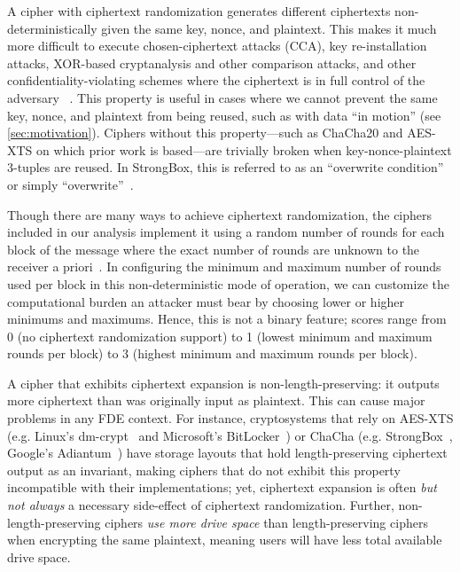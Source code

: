 
 A cipher with ciphertext
randomization generates different ciphertexts non-deterministically given the
same key, nonce, and plaintext. This makes it much more difficult to execute
chosen-ciphertext attacks (CCA), key re-installation attacks, XOR-based
cryptanalysis and other comparison attacks, and other confidentiality-violating
schemes where the ciphertext is in full control of the adversary
~\cite{Freestyle}. This property is useful in cases where we cannot prevent the
same key, nonce, and plaintext from being reused, such as with data ``in
motion'' (see \cref{sec:motivation}). Ciphers without this property---such as
ChaCha20 and AES-XTS on which prior work is based---are trivially broken when
key-nonce-plaintext 3-tuples are reused. In StrongBox, this is referred to as an
``overwrite condition'' or simply ``overwrite''~\cite{StrongBox}.

Though there are many ways to achieve ciphertext randomization, the ciphers
included in our analysis implement it using a random number of rounds for each
block of the message where the exact number of rounds are unknown to the
receiver a priori~\cite{Freestyle}. In configuring the minimum and maximum
number of rounds used per block in this non-deterministic mode of operation, we
can customize the computational burden an attacker must bear by choosing lower
or higher minimums and maximums. Hence, this is not a binary feature; scores
range from 0 (no ciphertext randomization support) to 1 (lowest minimum and
maximum rounds per block) to 3 (highest minimum and maximum rounds per block).



 A cipher that exhibits ciphertext
expansion is non-length-preserving: it outputs more ciphertext than was
originally input as plaintext. This can cause major problems in any FDE context.
For instance, cryptosystems that rely on AES-XTS (e.g. Linux's
dm-crypt~\cite{dmcrypt} and Microsoft's BitLocker~\cite{bitlocker1}) or ChaCha
(e.g. StrongBox~\cite{StrongBox}, Google's Adiantum~\cite{Adiantum}) have
storage layouts that hold length-preserving ciphertext output as an invariant,
making ciphers that do not exhibit this property incompatible with their
implementations; yet, ciphertext expansion is often {\em but not always} a
necessary side-effect of ciphertext randomization. Further,
non-length-preserving ciphers {\em use more drive space} than length-preserving
ciphers when encrypting the same plaintext, meaning users will have less total
available drive space.


